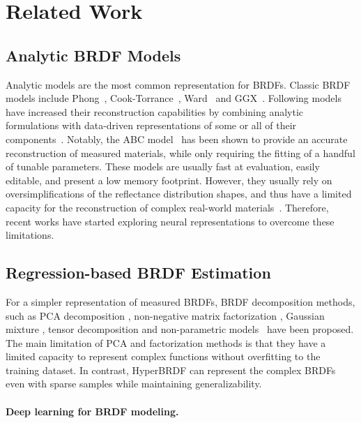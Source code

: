 \section{Related Work}
\label{sec:relatedwork}


\subsection{Analytic BRDF Models}
\label{hyperbrdf-RW}
Analytic models are the most common representation for BRDFs. Classic BRDF models include Phong~\cite{blinn77}, Cook-Torrance~\cite{cooktorrance1982}, Ward~\cite{ward1992} and GGX~\cite{walter2007microfacet}. Following models have increased their reconstruction capabilities by combining analytic formulations with data-driven representations of some or all of their components~\cite{dupuy2015, ashikhmin2007, bagher2016}. Notably, the ABC model~\cite{low2012} has been shown to provide an accurate reconstruction of measured materials, while only requiring the fitting of a handful of tunable parameters. These models are usually fast at evaluation, easily editable, and present a low memory footprint. However, they usually rely on oversimplifications of the reflectance distribution shapes, and thus have a limited capacity for the reconstruction of complex real-world materials~\cite{ngan2005, guarnera2016}. Therefore, recent works have started exploring neural representations to overcome these limitations.



\subsection{Regression-based BRDF Estimation}
For a simpler representation of measured BRDFs, BRDF decomposition methods, such as PCA decomposition 
\cite{matusik2003data, nielsen2015optimal, serrano2018intuitive}, non-negative matrix factorization \cite{lawrence2004efficient, lawrence2006inverse}, Gaussian mixture \cite{sun2007interactive}, tensor decomposition \cite{bilgili2011general, tongbuasirilai2020compact} 
and non-parametric models~\cite{bagher2016non} have been proposed. The main limitation of PCA and factorization methods is  that they have a limited capacity to represent complex functions without overfitting to the training dataset. In contrast, HyperBRDF can represent the complex BRDFs even with sparse samples while maintaining generalizability.


\paragraph{Deep learning for BRDF modeling.}

